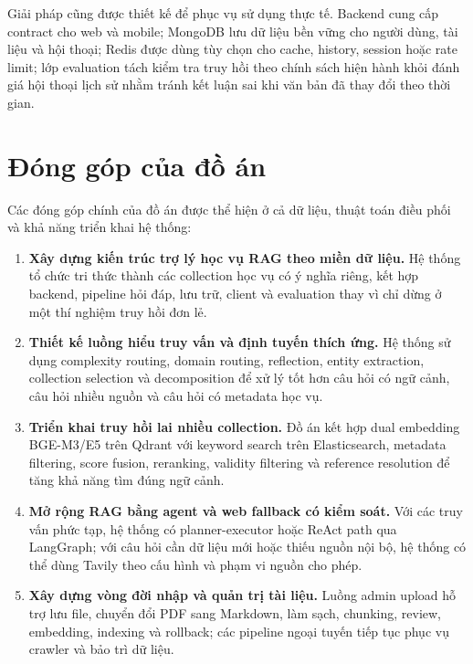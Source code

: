 \documentclass[../DoAn.tex]{subfiles}
\begin{document}
Giải pháp cũng được thiết kế để phục vụ sử dụng thực tế. Backend cung cấp contract
cho web và mobile; MongoDB lưu dữ liệu bền vững cho người dùng, tài liệu và hội
thoại; Redis được dùng tùy chọn cho cache, history, session hoặc rate limit; lớp
evaluation tách kiểm tra truy hồi theo chính sách hiện hành khỏi đánh giá hội
thoại lịch sử nhằm tránh kết luận sai khi văn bản đã thay đổi theo thời gian.

\section{Đóng góp của đồ án}
\label{sec:donggop}

Các đóng góp chính của đồ án được thể hiện ở cả dữ liệu, thuật toán điều phối và
khả năng triển khai hệ thống:

\begin{enumerate}
    \item \textbf{Xây dựng kiến trúc trợ lý học vụ RAG theo miền dữ liệu.}
    Hệ thống tổ chức tri thức thành các collection học vụ có ý nghĩa riêng,
    kết hợp backend, pipeline hỏi đáp, lưu trữ, client và evaluation thay vì chỉ
    dừng ở một thí nghiệm truy hồi đơn lẻ.

    \item \textbf{Thiết kế luồng hiểu truy vấn và định tuyến thích ứng.}
    Hệ thống sử dụng complexity routing, domain routing, reflection, entity
    extraction, collection selection và decomposition để xử lý tốt hơn câu hỏi
    có ngữ cảnh, câu hỏi nhiều nguồn và câu hỏi có metadata học vụ.

    \item \textbf{Triển khai truy hồi lai nhiều collection.}
    Đồ án kết hợp dual embedding BGE-M3/E5 trên Qdrant với keyword search trên
    Elasticsearch, metadata filtering, score fusion, reranking, validity
    filtering và reference resolution để tăng khả năng tìm đúng ngữ cảnh.

    \item \textbf{Mở rộng RAG bằng agent và web fallback có kiểm soát.}
    Với các truy vấn phức tạp, hệ thống có planner-executor hoặc ReAct path qua
    LangGraph; với câu hỏi cần dữ liệu mới hoặc thiếu nguồn nội bộ, hệ thống có
    thể dùng Tavily theo cấu hình và phạm vi nguồn cho phép.

    \item \textbf{Xây dựng vòng đời nhập và quản trị tài liệu.}
    Luồng admin upload hỗ trợ lưu file, chuyển đổi PDF sang Markdown, làm sạch,
    chunking, review, embedding, indexing và rollback; các pipeline ngoại tuyến
    tiếp tục phục vụ crawler và bảo trì dữ liệu.


\end{enumerate}
\end{document}
